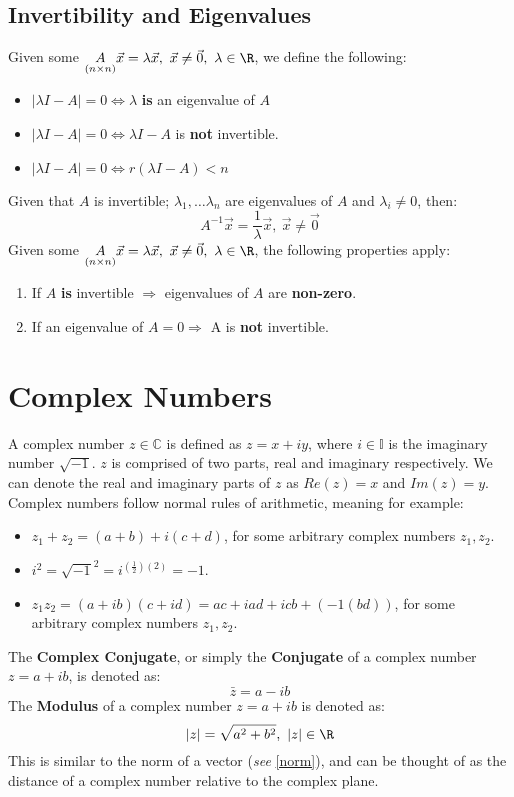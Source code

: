 \documentclass[a4paper]{article}
\begin{document}
  \subsection{Invertibility and Eigenvalues}
  Given some $\underset{(n\times n)}{A} \vec{x} = \lambda \vec{x}, \ \vec{x} \neq \vec{0}, \ \lambda \in \R$, we define the following:
  \begin{itemize}
    \item $|\lambda I -A| = 0 \Leftrightarrow \lambda$ \textbf{is} an eigenvalue of $A$
    \item $|\lambda I -A| = 0 \Leftrightarrow \lambda I -A$ is \textbf{not} invertible.
    \item $|\lambda I -A| = 0 \Leftrightarrow r(\lambda I - A) < n$ 
  \end{itemize}
  Given that $A$ is invertible; $\lambda_1, \dots \lambda_n$ are eigenvalues of $A$ and $\lambda_i \neq 0$, then:
  \[
    A^{-1}\vec{x} = \frac{1 }{\lambda} \vec{x}, \ \vec{x} \neq \vec{0}
  \]
  Given some $\underset{(n\times n)}{A} \vec{x} = \lambda \vec{x}, \ \vec{x} \neq \vec{0}, \ \lambda \in \R$, the following properties apply:
  \begin{enumerate}
    \item If $A$ \textbf{is} invertible $\Rightarrow$ eigenvalues of $A$ are \textbf{non-zero}.
    \item If an eigenvalue of $A = 0 \Rightarrow$ A is \textbf{not} invertible.
  \end{enumerate}

  \section{Complex Numbers}
  A complex number $z \in \mathbb{C}$ is defined as $z = x + iy$, where $i \in \mathbb{I}$ is the imaginary number $\sqrt{-1}$. $z$ is comprised of two parts, real and imaginary respectively. We can denote the real and imaginary parts of $z$ as $Re(z) = x$ and $Im(z) = y$. Complex numbers follow normal rules of arithmetic, meaning for example:
  \begin{itemize}
    \item $z_1 + z_2 = (a+b) + i(c+d)$, for some arbitrary complex numbers $z_1,z_2$.
    \item $i^2 = \sqrt{-1}^2 = i^{(\frac{1 }{2}) (2)} = -1$.
    \item $z_1z_2 = (a+ib)(c+id) = ac + iad + icb + (-1(bd))$, for some arbitrary complex numbers $z_1,z_2$.
  \end{itemize}
  The \textbf{Complex Conjugate}, or simply the \textbf{Conjugate} of a complex number $z = a + ib$, is denoted as:
  \[
    \bar{z} = a-ib
  \]
  The \textbf{Modulus} of a complex number $z = a + ib$ is denoted as:
  \[
    |z| = \sqrt{a^2 + b^2}, \ |z| \in \R
  \]
  This is similar to the norm of a vector (\textit{see }\ref{norm}), and can be thought of as the distance of a complex number relative to the complex plane.
\end{document}
